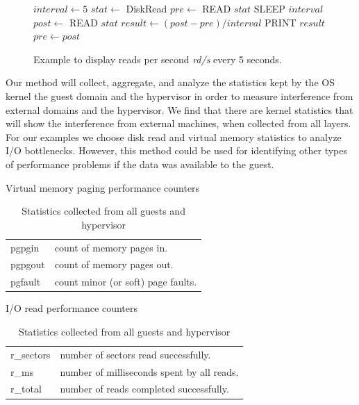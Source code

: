 \begin{figure}[h]
\begin{algorithmic}[H]
 \STATE $interval \gets 5$
 \STATE $stat \gets$  DiskRead       
 \STATE $pre \gets $ READ $stat$ 
 \LOOP
    \STATE SLEEP $interval$
    \STATE $post \gets$ READ $stat$
    \STATE $result \gets (post - pre)/interval$
    \STATE PRINT  $result$
    \STATE $pre \gets post$ 
 \ENDLOOP
\end{algorithmic}
\caption{Example to display reads per second \emph{rd/s} every 5 seconds.}
\label{alg1}
\end{figure}

Our method will collect, aggregate, and analyze the statistics kept by the OS kernel the guest domain and the hypervisor in order to measure interference from external domains and the hypervisor.  We find that there are kernel statistics that will show the interference from external machines, when collected from all layers.  For our examples we choose disk read and virtual memory statistics to analyze I/O bottlenecks.  However, this method could be used for identifying other types of performance problems if the data was available to the guest.

\begin{table}[h]
\begin{subtable}[h]{0.45\textwidth}
\caption{Virtual memory paging performance counters \cite{memory}}
\begin{tabular}{ l l }
       pgpgin  &  count of memory pages in. \\
       pgpgout  & count of memory pages out. \\
       pgfault  & count minor (or soft) page faults. \\
\end{tabular}
\label{fig:memory}
\end{subtable}
\hfill
\begin{subtable}[h]{0.45\textwidth}
\caption{I/O read performance counters \cite{iostats}}
\begin{tabular}{ l l }
       r\_sectors & number of sectors read successfully. \\
       r\_ms & number of milliseconds spent by all reads. \\
       r\_total & number of reads completed successfully. \\
\end{tabular}
\label{fig:io}
\end{subtable}
\caption{Statistics collected from all guests and hypervisor}
\end{table}

